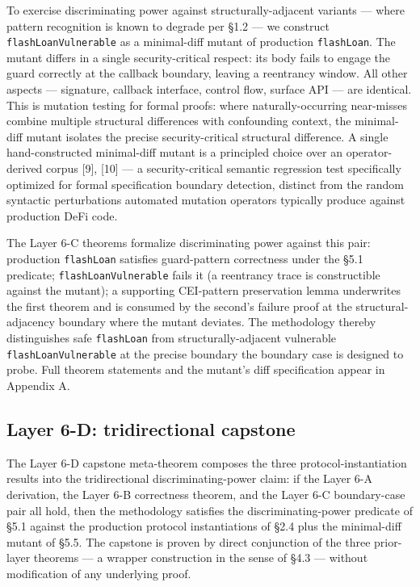 To exercise discriminating power against structurally-adjacent variants
--- where pattern recognition is known to degrade per §1.2 --- we
construct \texttt{flashLoanVulnerable} as a minimal-diff mutant of
production \texttt{flashLoan}. The mutant differs in a single
security-critical respect: its body fails to engage the guard correctly
at the callback boundary, leaving a reentrancy window. All other aspects
--- signature, callback interface, control flow, surface API --- are
identical. This is mutation testing for formal proofs: where
naturally-occurring near-misses combine multiple structural differences
with confounding context, the minimal-diff mutant isolates the precise
security-critical structural difference. A single hand-constructed
minimal-diff mutant is a principled choice over an operator-derived
corpus {[}9{]}, {[}10{]} --- a security-critical semantic regression
test specifically optimized for formal specification boundary detection,
distinct from the random syntactic perturbations automated mutation
operators typically produce against production DeFi code.

The Layer 6-C theorems formalize discriminating power against this pair:
production \texttt{flashLoan} satisfies guard-pattern correctness under
the §5.1 predicate; \texttt{flashLoanVulnerable} fails it (a reentrancy
trace is constructible against the mutant); a supporting CEI-pattern
preservation lemma underwrites the first theorem and is consumed by the
second's failure proof at the structural-adjacency boundary where the
mutant deviates. The methodology thereby distinguishes safe
\texttt{flashLoan} from structurally-adjacent vulnerable
\texttt{flashLoanVulnerable} at the precise boundary the boundary case
is designed to probe. Full theorem statements and the mutant's diff
specification appear in Appendix A.

\subsection{Layer 6-D: tridirectional
capstone}\label{layer-6-d-tridirectional-capstone}

The Layer 6-D capstone meta-theorem composes the three
protocol-instantiation results into the tridirectional
discriminating-power claim: if the Layer 6-A derivation, the Layer 6-B
correctness theorem, and the Layer 6-C boundary-case pair all hold, then
the methodology satisfies the discriminating-power predicate of §5.1
against the production protocol instantiations of §2.4 plus the
minimal-diff mutant of §5.5. The capstone is proven by direct
conjunction of the three prior-layer theorems --- a wrapper construction
in the sense of §4.3 --- without modification of any underlying proof.

